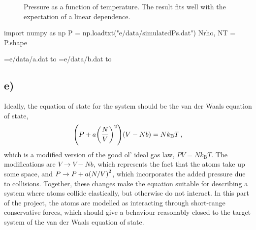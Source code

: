 \documentclass[11pt,british,a4paper]{report}
\begin{document}
\begin{figure}[htbp]
    \centering
    \caption{Pressure as a function of temperature. The result fits well with the expectation of a linear dependence.}\label{fig:presstemp}
\end{figure}



%
\begin{pycode}[NrhoNT]
import numpy as np
P = np.loadtxt("e/data/simulatedPs.dat")
Nrho, NT = P.shape
\end{pycode}
\openin\infile=e/data/a.dat
\read\infile to \aparam
\closein\infile
\openin\infile=e/data/b.dat
\read\infile to \bparam
\closein\infile
\subsection*{e)}
Ideally, the equation of state for the system should be the van der Waals equation of state,
\[
    \qty(P+a\qty(\frac{N}{V})^2)\qty(V-Nb) = Nk_\mathrm{B}T\,,
\]
which is a modified version of the good ol' ideal gas law, \(PV=Nk_\mathrm{B}T\). The modifications are \(V\to V-Nb\), which represents the fact that the atoms take up some space, and \(P\to P+a\qty(N/V)^2\), which incorporates the added pressure due to collisions.
Together, these changes make the equation suitable for describing a system where atoms collide elastically, but otherwise do not interact.
In this part of the project, the atoms are modelled as interacting through short-range conservative forces, which should give a behaviour reasonably closed to the target system of the van der Waals equation of state.
\end{document}
